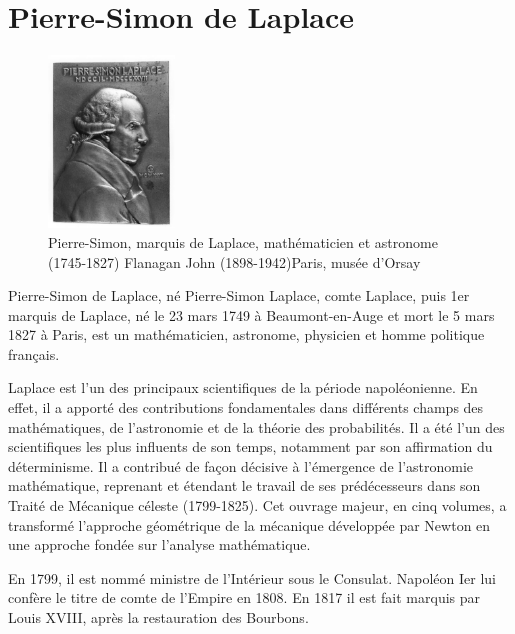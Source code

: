 \chapter{Pierre-Simon de Laplace\label{annexe-lap_irl}}

\begin{figure}[!h]
\centering
    \includegraphics[width=0.3\textwidth]{fig/Pierre-Simon-Laplace_2}
    \caption{Pierre-Simon, marquis de Laplace, mathématicien et astronome (1745-1827)
    Flanagan John (1898-1942)Paris, musée d'Orsay}
\end{figure}

Pierre-Simon de Laplace, né Pierre-Simon Laplace, comte Laplace, puis 1er marquis de Laplace, né le 
23 mars 1749 à Beaumont-en-Auge et mort le 5 mars 1827 à Paris, est un mathématicien, 
astronome, physicien et homme politique français.

Laplace est l'un des principaux scientifiques de la période napoléonienne. 
En effet, il a apporté des contributions fondamentales dans différents champs des mathématiques, 
de l'astronomie et de la théorie des probabilités. Il a été l'un des scientifiques les 
plus influents de son temps, notamment par son affirmation du déterminisme. Il a contribué 
de façon décisive à l'émergence de l'astronomie mathématique, reprenant et 
étendant le travail de ses prédécesseurs dans son Traité de Mécanique céleste (1799-1825). 
Cet ouvrage majeur, en cinq volumes, a transformé l'approche géométrique de la mécanique 
développée par Newton en une approche fondée sur l'analyse mathématique.

En 1799, il est nommé ministre de l'Intérieur sous le Consulat. Napoléon Ier lui 
confère le titre de comte de l'Empire en 1808. En 1817 il est fait marquis par Louis XVIII, 
après la restauration des Bourbons.
